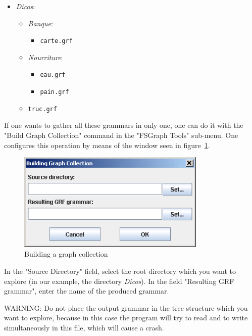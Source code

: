 \begin{itemize}
  \item \textit{Dicos}:
  \begin{itemize}
    \item \textit{Banque}:
    \begin{itemize}
      \item \texttt{carte.grf}
    \end{itemize}
    \item \textit{Nourriture}:
    \begin{itemize}
      \item \texttt{eau.grf}
      \item \texttt{pain.grf}
    \end{itemize}
    \item \texttt{truc.grf}
  \end{itemize}
\end{itemize}

\noindent If one wants to gather all these grammars in only one, one can do it
with the "Build Graph Collection" command in the "FSGraph Tools" sub-menu. One configures
this operation by means of the window seen in
figure~\ref{fig-build-graph-collection}.

\begin{figure}[!h]
\begin{center}
\includegraphics[width=9cm]{resources/img/fig6-20.png}
\caption{Building a graph collection\label{fig-build-graph-collection}}
\end{center}
\end{figure}

\noindent In the "Source Directory" field, select the root directory which you
want to explore (in our example, the directory \textit{Dicos}). In the field "Resulting
GRF grammar", enter the name of the produced grammar.

\bigskip
\noindent WARNING: Do not place the output grammar in the tree structure which
you want to explore, because in this case the program will try to read and to write
simultaneously in this file, which will cause a crash.

